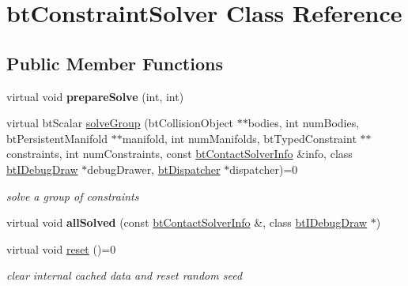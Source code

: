 \hypertarget{classbtConstraintSolver}{}\section{bt\+Constraint\+Solver Class Reference}
\label{classbtConstraintSolver}
\subsection*{Public Member Functions}
\begin{DoxyCompactItemize}
\item 
\mbox{\label{classbtConstraintSolver_a90ff1d9f2d3fa9228c69cd695a3d5682}} 
virtual void {\bfseries prepare\+Solve} (int, int)
\item 
\mbox{\label{classbtConstraintSolver_a923b7573a8d62805714abd5157dd0963}} 
virtual bt\+Scalar \hyperlink{classbtConstraintSolver_a923b7573a8d62805714abd5157dd0963}{solve\+Group} (bt\+Collision\+Object $\ast$$\ast$bodies, int num\+Bodies, bt\+Persistent\+Manifold $\ast$$\ast$manifold, int num\+Manifolds, bt\+Typed\+Constraint $\ast$$\ast$constraints, int num\+Constraints, const \hyperlink{structbtContactSolverInfo}{bt\+Contact\+Solver\+Info} \&info, class \hyperlink{classbtIDebugDraw}{bt\+I\+Debug\+Draw} $\ast$debug\+Drawer, \hyperlink{classbtDispatcher}{bt\+Dispatcher} $\ast$dispatcher)=0
\begin{DoxyCompactList}\small\item\em solve a group of constraints \end{DoxyCompactList}\item 
\mbox{\label{classbtConstraintSolver_a5bdefc71a1f24bdfb997515db8c2548e}} 
virtual void {\bfseries all\+Solved} (const \hyperlink{structbtContactSolverInfo}{bt\+Contact\+Solver\+Info} \&, class \hyperlink{classbtIDebugDraw}{bt\+I\+Debug\+Draw} $\ast$)
\item 
\mbox{\label{classbtConstraintSolver_aefecf97d956c5f1ad16a8b00b2f36aa9}} 
virtual void \hyperlink{classbtConstraintSolver_aefecf97d956c5f1ad16a8b00b2f36aa9}{reset} ()=0
\begin{DoxyCompactList}\small\item\em clear internal cached data and reset random seed \end{DoxyCompactList}\item 
$$
\end{DoxyCompactItemize}
